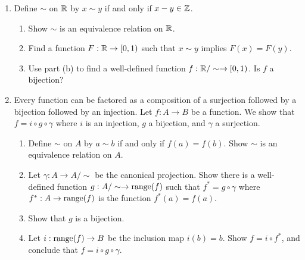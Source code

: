 \begin{exercises}{}{}
\begin{enumerate}
\item Define $\sim$ on $\mathbb{R}$ by $x \sim y$ if and only if $x - y \in \mathbb{Z}$. 
\begin{enumerate}
    \item Show $\sim$ is an equivalence relation on $\mathbb{R}$.
    \item Find a function $F : \mathbb{R} \to [0,1)$ such that $x \sim y$ implies $F(x) = F(y)$.
    \item Use part (b) to find a well-defined function $f : \mathbb{R} / \sim \to [0,1)$. Is $f$ a bijection?
\end{enumerate}

\item Every function can be factored as a composition of a surjection followed by a bijection followed by an injection. Let $f : A \to B$ be a function. We show that $f = i \circ g \circ \gamma$ where $i$ is an injection, $g$ a bijection, and $\gamma$ a surjection.
\begin{enumerate}
    \item Define $\sim$ on $A$ by $a \sim b$ if and only if $f(a) = f(b)$. Show $\sim$ is an equivalence relation on $A$.
    \item Let $\gamma : A \to A/\sim$ be the canonical projection. Show there is a well-defined function $g : A/\sim \to \operatorname{range}(f)$ such that $f^* = g \circ \gamma$ where $f^* : A \to \operatorname{range}(f)$ is the function $f^*(a) = f(a)$.
    \item Show that $g$ is a bijection.
    \item Let $i : \operatorname{range}(f) \to B$ be the inclusion map $i(b) = b$. Show $f = i \circ f^*$, and conclude that $f = i \circ g \circ \gamma$.
\end{enumerate}
\end{enumerate}

\end{exercises}


